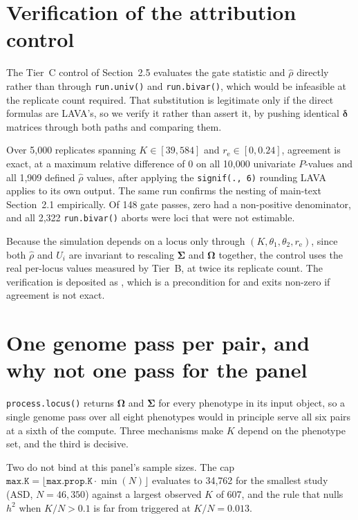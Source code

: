 \documentclass[11pt,a4paper]{article}
\newcommand{\rh}{\hat{\rho}}
\newcommand{\Om}{\bm{\Omega}}
\newcommand{\Sig}{\bm{\Sigma}}
\newcommand{\re}{r_{\mathrm{e}}}
\begin{document}
\section{Verification of the attribution control}

The Tier~C control of Section~2.5 evaluates the gate statistic and $\rh$ directly rather
than through \texttt{run.univ()} and \texttt{run.bivar()}, which would be infeasible at
the replicate count required. That substitution is legitimate only if the direct formulas
are LAVA's, so we verify it rather than assert it, by pushing identical $\bm{\delta}$
matrices through both paths and comparing them.

Over 5,000 replicates spanning $K\in[39,584]$ and $\re\in[0,0.24]$, agreement is exact, at
a maximum relative difference of 0 on all 10,000 univariate $P$-values and all 1,909
defined $\rh$ values, after applying the \texttt{signif(., 6)} rounding LAVA applies to its
own output. The same run confirms the nesting of main-text Section~2.1 empirically. Of 148
gate passes, zero had a non-positive denominator, and all 2,322 \texttt{run.bivar()} aborts
were loci that were not estimable.

Because the simulation depends on a locus only through $(K,\theta_1,\theta_2,\re)$, since
both $\rh$ and $U_i$ are invariant to rescaling $\Sig$ and $\Om$ together, the control
uses the real per-locus values measured by Tier~B, at twice its replicate count. The
verification is deposited as , which is a
precondition for  and exits non-zero if agreement is not
exact.

\section{One genome pass per pair, and why not one pass for the panel}

\texttt{process.locus()} returns $\Om$ and $\Sig$ for every phenotype in its input object,
so a single genome pass over all eight phenotypes would in principle serve all six pairs at
a sixth of the compute. Three mechanisms make $K$ depend on the phenotype set, and the
third is decisive.

Two do not bind at this panel's sample sizes. The cap
$\texttt{max.K} = \lfloor \texttt{max.prop.K}\cdot\min(N)\rfloor$ evaluates to 34,762 for
the smallest study (ASD, $N=46{,}350$) against a largest observed $K$ of 607, and the rule
that nulls $h^2$ when $K/N > 0.1$ is far from triggered at $K/N = 0.013$.
\end{document}
